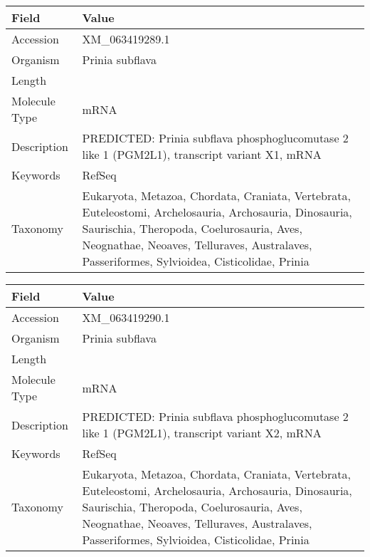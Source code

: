 \documentclass[10pt]{article}
\begin{document}
\vspace{1em}
{\footnotesize
\begin{longtable}{>{\raggedright\arraybackslash}p{4.5cm} >{\raggedright\arraybackslash}p{11.5cm}}
\textbf{Field} & \textbf{Value} \\
\hline
Accession & XM\_063419289.1 \\
Organism & Prinia subflava \\
Length & 6038 \\
Molecule Type & mRNA \\
Description & PREDICTED: Prinia subflava phosphoglucomutase 2 like 1 (PGM2L1), transcript variant X1, mRNA \\
Keywords & RefSeq \\
Taxonomy & Eukaryota, Metazoa, Chordata, Craniata, Vertebrata, Euteleostomi, Archelosauria, Archosauria, Dinosauria, Saurischia, Theropoda, Coelurosauria, Aves, Neognathae, Neoaves, Telluraves, Australaves, Passeriformes, Sylvioidea, Cisticolidae, Prinia \\
\end{longtable}
}

\vspace{1em}
{\footnotesize
\begin{longtable}{>{\raggedright\arraybackslash}p{4.5cm} >{\raggedright\arraybackslash}p{11.5cm}}
\textbf{Field} & \textbf{Value} \\
\hline
Accession & XM\_063419290.1 \\
Organism & Prinia subflava \\
Length & 5840 \\
Molecule Type & mRNA \\
Description & PREDICTED: Prinia subflava phosphoglucomutase 2 like 1 (PGM2L1), transcript variant X2, mRNA \\
Keywords & RefSeq \\
Taxonomy & Eukaryota, Metazoa, Chordata, Craniata, Vertebrata, Euteleostomi, Archelosauria, Archosauria, Dinosauria, Saurischia, Theropoda, Coelurosauria, Aves, Neognathae, Neoaves, Telluraves, Australaves, Passeriformes, Sylvioidea, Cisticolidae, Prinia \\
\end{longtable}
}
\end{document}
